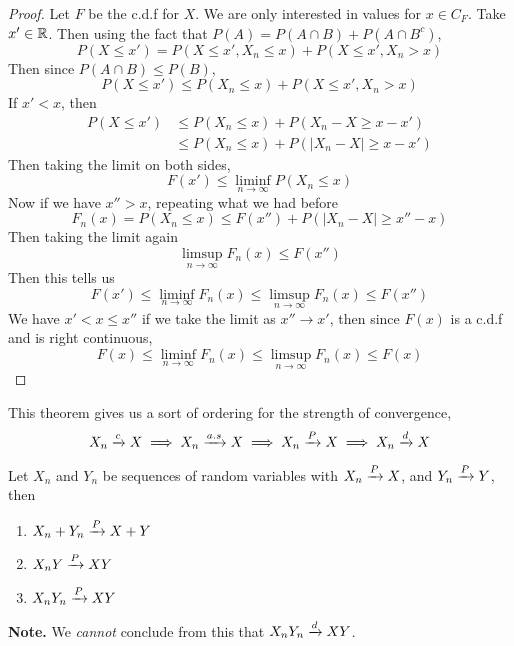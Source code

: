 \begin{proof}
    Let $F$ be the c.d.f for $X$.  We are only interested in values for $x \in C_F$. Take $x' \in \mathbb{R}$. Then using the fact that $P(A) = P(A \cap B) + P(A \cap B^c)$,
    \[P(X \leq x') = P(X\leq x', X_n \leq x) + P(X \leq x', X_n > x)\]
    Then since $P(A \cap B) \leq P(B)$,
    \[P(X \leq x') \leq P(X_n \leq x) + P(X \leq x', X_n > x)\]
    If $x' < x$, then 
    \begin{align*}
        P(X \leq x') &\leq P(X_n \leq x) + P(X_n - X \geq x - x')\\
        &\leq P(X_n \leq x) + P(|X_n - X| \geq x - x') 
    \end{align*}
    Then taking the limit on both sides, 
    \[F(x') \leq \liminf_{n\rightarrow\infty} P(X_n \leq x)\]
    Now if we have $x'' > x$, repeating what we had before
    \[F_n(x) = P(X_n \leq x) \leq F(x'') + P(|X_n - X| \geq x'' -x)\]
    Then taking the limit again 
    \[\limsup_{n\rightarrow\infty} F_n(x) \leq F(x'')\]
    Then this tells us 
    \[F(x') \leq \liminf_{n\rightarrow\infty}F_n(x) \leq \limsup_{n\rightarrow\infty} F_n(x) \leq F(x'')\]
    We have $x' < x \leq x''$ if we take the limit as $x'' \rightarrow x'$, then since $F(x)$ is a c.d.f and is right continuous, 
    \[F(x) \leq \liminf_{n\rightarrow\infty} F_n(x) \leq \limsup_{n\rightarrow\infty} F_n(x) \leq F(x)\]
\end{proof}
This theorem gives us a sort of ordering for the strength of convergence, 
\[X_n \xrightarrow{c} X \implies X_n \xrightarrow{a.s} X \implies X_n \xrightarrow{P} X \implies X_n \xrightarrow{d} X\]
\begin{theorem}
    Let $X_n$ and $Y_n$ be sequences of random variables with $X_n \xrightarrow{P} X$, and $Y_n \xrightarrow{P} Y$, then 
    \begin{enumerate}[label=(\roman*)]
        \item $X_n + Y_n \xrightarrow{P} X+Y$
        \item $X_nY \xrightarrow{P} XY$
        \item $X_nY_n \xrightarrow{P} XY$
    \end{enumerate}
\end{theorem}
\textbf{Note.} We \emph{cannot} conclude from this that $X_nY_n \xrightarrow{d} XY$.
